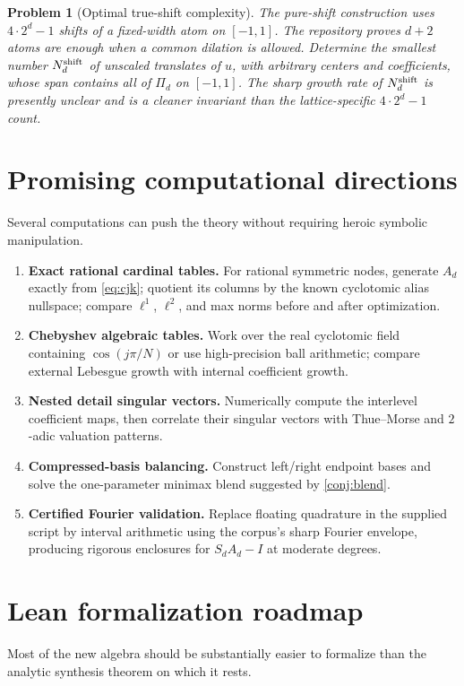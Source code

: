 \documentclass[11pt,oneside]{article}
\numberwithin{equation}{section}
\newtheorem{problem}[theorem]{Problem}
\theoremstyle{definition}
\theoremstyle{remark}
\begin{document}
\begin{problem}[Optimal true-shift complexity]
\label{prob:shift-complexity}
The pure-shift construction uses \(4\cdot2^d-1\) shifts of a fixed-width atom on
\([-1,1]\).  The repository proves \(d+2\) atoms are enough when a common dilation
is allowed.  Determine the smallest number \(N_d^{\rm shift}\) of \emph{unscaled}
translates of \(u\), with arbitrary centers and coefficients, whose span contains
all of \(\Pi_d\) on \([-1,1]\).  The sharp growth rate of
\(N_d^{\rm shift}\) is presently unclear and is a cleaner invariant than the
lattice-specific \(4\cdot2^d-1\) count.
\end{problem}

\section{Promising computational directions}
\label{sec:computation}
Several computations can push the theory without requiring heroic symbolic
manipulation.
\begin{enumerate}
\item \textbf{Exact rational cardinal tables.}  For rational symmetric nodes,
      generate \(A_d\) exactly from \eqref{eq:cjk}; quotient its columns by the
      known cyclotomic alias nullspace; compare \(\ell^1\), \(\ell^2\), and max
      norms before and after optimization.
\item \textbf{Chebyshev algebraic tables.}  Work over the real cyclotomic field
      containing \(\cos(j\pi/N)\) or use high-precision ball arithmetic; compare
      external Lebesgue growth with internal coefficient growth.
\item \textbf{Nested detail singular vectors.}  Numerically compute the
      interlevel coefficient maps, then correlate their singular vectors with
      Thue--Morse and \(2\)-adic valuation patterns.
\item \textbf{Compressed-basis balancing.}  Construct left/right endpoint bases
      and solve the one-parameter minimax blend suggested by
      \cref{conj:blend}.
\item \textbf{Certified Fourier validation.}  Replace floating quadrature in the
      supplied script by interval arithmetic using the corpus's sharp Fourier
      envelope, producing rigorous enclosures for \(S_dA_d-I\) at moderate
      degrees.
\end{enumerate}

\section{Lean formalization roadmap}
\label{sec:lean}
Most of the new algebra should be substantially easier to formalize than the
analytic synthesis theorem on which it rests.
\end{document}
